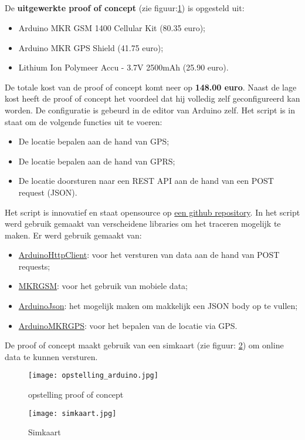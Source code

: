 \subsection{}
De \textbf{uitgewerkte proof of concept} (zie figuur:\ref{fig:opstelling_arduino}) is opgesteld uit:
\begin{itemize}
	\item Arduino MKR GSM 1400 Cellular Kit (80.35 euro);
	\item Arduino MKR GPS Shield (41.75 euro);
	\item Lithium Ion Polymeer Accu - 3.7V 2500mAh (25.90 euro).
\end{itemize}
De totale kost van de proof of concept komt neer op \textbf{148.00 euro}. Naast de lage kost heeft de proof of concept het voordeel dat hij volledig zelf geconfigureerd kan worden. De configuratie is gebeurd in de editor van Arduino zelf. Het script is in staat om de volgende functies uit te voeren:
\begin{itemize}
	\item De locatie bepalen aan de hand van GPS;
	\item De locatie bepalen aan de hand van GPRS;
	\item De locatie doorsturen naar een REST API aan de hand van een POST request (JSON).
\end{itemize}
Het script is innovatief en staat opensource op \href{https://github.com/IndyVC/bap-arduino}{een github repository}. In het script werd gebruik gemaakt van verscheidene libraries om het traceren mogelijk te maken.
Er werd gebruik gemaakt van:
\begin{itemize}
	\item \href{https://github.com/arduino-libraries/ArduinoHttpClient}{ArduinoHttpClient}: voor het versturen van data aan de hand van POST requests;
	\item \href{https://github.com/arduino-libraries/MKRGSM}{MKRGSM}: voor het gebruik van mobiele data;
	\item \href{https://github.com/bblanchon/ArduinoJson}{ArduinoJson}: het mogelijk maken om makkelijk een JSON body op te vullen;
	\item \href{https://github.com/arduino-libraries/Arduino_MKRGPS}{ArduinoMKRGPS}: voor het bepalen van de locatie via GPS.
\end{itemize}
De proof of concept maakt gebruik van een simkaart (zie figuur: \ref{fig:simkaart}) om online data te kunnen versturen. 
\begin{figure}
	\texttt{[image: opstelling\_arduino.jpg]}
	\caption{opstelling proof of concept}
	\label{fig:opstelling_arduino}
\end{figure}
\begin{figure}
	\texttt{[image: simkaart.jpg]}
	\caption{Simkaart}
	\label{fig:simkaart}
\end{figure}

